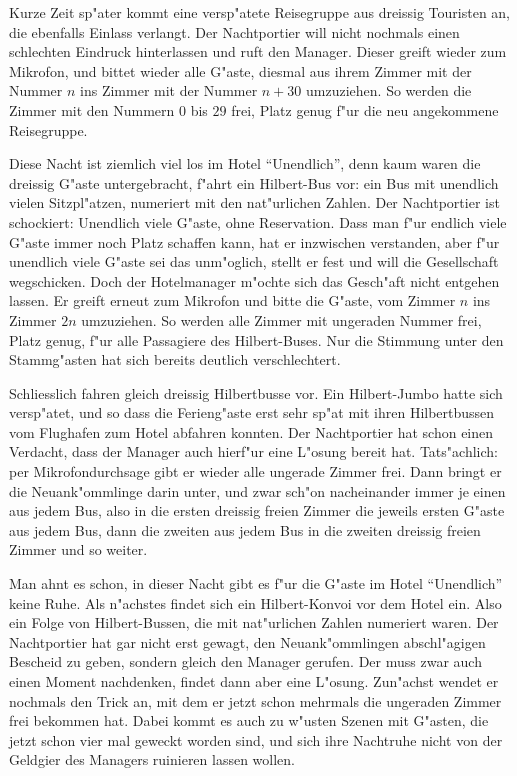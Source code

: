 Kurze Zeit sp"ater kommt eine versp"atete Reisegruppe aus dreissig
Touristen an, die ebenfalls
Einlass verlangt. Der Nachtportier will nicht nochmals einen schlechten
Eindruck hinterlassen und ruft den Manager. Dieser greift
wieder zum Mikrofon, und bittet wieder alle G"aste, diesmal aus
ihrem Zimmer mit der Nummer $n$ ins Zimmer mit der Nummer $n+30$
umzuziehen. So werden die Zimmer mit den Nummern $0$ bis $29$ frei,
Platz genug f"ur die neu angekommene Reisegruppe.

Diese Nacht ist ziemlich viel los im Hotel ``Unendlich'', denn
kaum waren die dreissig G"aste untergebracht, f"ahrt ein Hilbert-Bus
vor: ein Bus mit unendlich vielen Sitzpl"atzen, numeriert mit den
nat"urlichen Zahlen. Der Nachtportier ist schockiert: Unendlich
viele G"aste, ohne Reservation. Dass man f"ur endlich viele G"aste
immer noch Platz schaffen kann, hat er inzwischen verstanden, aber
f"ur unendlich viele G"aste sei das unm"oglich, stellt er fest und
will die Gesellschaft wegschicken. Doch der Hotelmanager m"ochte
sich das Gesch"aft nicht entgehen lassen. Er greift erneut zum 
Mikrofon und bitte die G"aste, vom Zimmer $n$ ins Zimmer $2n$ umzuziehen.
So werden alle Zimmer mit ungeraden Nummer frei, Platz genug, f"ur alle
Passagiere des Hilbert-Buses. Nur die Stimmung unter den Stammg"asten
hat sich bereits deutlich verschlechtert.

Schliesslich fahren gleich dreissig Hilbertbusse vor. Ein Hilbert-Jumbo
hatte sich versp"atet, und so dass die Ferieng"aste erst sehr sp"at
mit ihren Hilbertbussen vom Flughafen zum Hotel abfahren konnten.
Der Nachtportier hat schon einen Verdacht, dass der Manager auch
hierf"ur eine L"osung bereit hat. Tats"achlich: per Mikrofondurchsage
gibt er wieder alle ungerade Zimmer frei. Dann bringt er die Neuank"ommlinge
darin unter, und zwar sch"on nacheinander immer je einen aus jedem Bus,
also in die ersten dreissig freien Zimmer die jeweils ersten G"aste
aus jedem Bus, dann die zweiten aus jedem Bus in die zweiten dreissig
freien Zimmer und so weiter.

Man ahnt es schon, in dieser Nacht gibt es f"ur die G"aste im Hotel
``Unendlich'' keine Ruhe. Als n"achstes findet sich ein Hilbert-Konvoi
vor dem Hotel ein. Also ein Folge von Hilbert-Bussen, die mit nat"urlichen
Zahlen numeriert waren. Der Nachtportier hat gar nicht erst gewagt, 
den Neuank"ommlingen abschl"agigen Bescheid zu geben, sondern gleich
den Manager gerufen. Der muss zwar auch einen Moment nachdenken, findet
dann aber eine L"osung. Zun"achst wendet er nochmals den Trick an, 
mit dem er jetzt schon mehrmals die ungeraden Zimmer frei bekommen hat.
Dabei kommt es auch zu w"usten Szenen mit G"asten, die jetzt schon vier mal
geweckt worden sind, und sich ihre Nachtruhe nicht von der Geldgier des 
Managers ruinieren lassen wollen.


